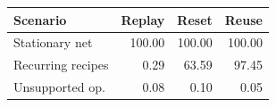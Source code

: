 \begin{tabular}{lrrr}
\toprule
Scenario & Replay & Reset & Reuse \\
\midrule
Stationary net & 100.00 & 100.00 & 100.00 \\
Recurring recipes & 0.29 & 63.59 & 97.45 \\
Unsupported op. & 0.08 & 0.10 & 0.05 \\
\bottomrule
\end{tabular}
